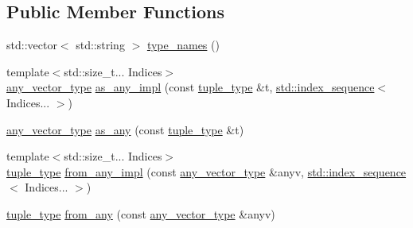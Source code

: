 \subsection*{Public Member Functions}
\begin{DoxyCompactItemize}
\item 
std\+::vector$<$ std\+::string $>$ \hyperlink{struct_wire_cell_1_1tuple__helper_3_01_t_3_01_types_8_8_8_01_4_01_4_a55bdb6587f4f043ac4bb8f661d6c18f7}{type\+\_\+names} ()
\item 
{\footnotesize template$<$std\+::size\+\_\+t... Indices$>$ }\\\hyperlink{struct_wire_cell_1_1tuple__helper_3_01_t_3_01_types_8_8_8_01_4_01_4_a09d92f40f36eccfe85165e6ab93a6217}{any\+\_\+vector\+\_\+type} \hyperlink{struct_wire_cell_1_1tuple__helper_3_01_t_3_01_types_8_8_8_01_4_01_4_a92048a9ccf4531bc1576e8684573e487}{as\+\_\+any\+\_\+impl} (const \hyperlink{struct_wire_cell_1_1tuple__helper_3_01_t_3_01_types_8_8_8_01_4_01_4_aef55cc988f5f41eff16f4a116bbd5fc5}{tuple\+\_\+type} \&t, \hyperlink{structstd_1_1index__sequence}{std\+::index\+\_\+sequence}$<$ Indices... $>$)
\item 
\hyperlink{struct_wire_cell_1_1tuple__helper_3_01_t_3_01_types_8_8_8_01_4_01_4_a09d92f40f36eccfe85165e6ab93a6217}{any\+\_\+vector\+\_\+type} \hyperlink{struct_wire_cell_1_1tuple__helper_3_01_t_3_01_types_8_8_8_01_4_01_4_a8f26063d1e734310dc6b733ace4a460f}{as\+\_\+any} (const \hyperlink{struct_wire_cell_1_1tuple__helper_3_01_t_3_01_types_8_8_8_01_4_01_4_aef55cc988f5f41eff16f4a116bbd5fc5}{tuple\+\_\+type} \&t)
\item 
{\footnotesize template$<$std\+::size\+\_\+t... Indices$>$ }\\\hyperlink{struct_wire_cell_1_1tuple__helper_3_01_t_3_01_types_8_8_8_01_4_01_4_aef55cc988f5f41eff16f4a116bbd5fc5}{tuple\+\_\+type} \hyperlink{struct_wire_cell_1_1tuple__helper_3_01_t_3_01_types_8_8_8_01_4_01_4_a4f9e5b34091dcc6c12f0440f00db33ed}{from\+\_\+any\+\_\+impl} (const \hyperlink{struct_wire_cell_1_1tuple__helper_3_01_t_3_01_types_8_8_8_01_4_01_4_a09d92f40f36eccfe85165e6ab93a6217}{any\+\_\+vector\+\_\+type} \&anyv, \hyperlink{structstd_1_1index__sequence}{std\+::index\+\_\+sequence}$<$ Indices... $>$)
\item 
\hyperlink{struct_wire_cell_1_1tuple__helper_3_01_t_3_01_types_8_8_8_01_4_01_4_aef55cc988f5f41eff16f4a116bbd5fc5}{tuple\+\_\+type} \hyperlink{struct_wire_cell_1_1tuple__helper_3_01_t_3_01_types_8_8_8_01_4_01_4_aac3be802651ad5c8f921c01857134f99}{from\+\_\+any} (const \hyperlink{struct_wire_cell_1_1tuple__helper_3_01_t_3_01_types_8_8_8_01_4_01_4_a09d92f40f36eccfe85165e6ab93a6217}{any\+\_\+vector\+\_\+type} \&anyv)
\end{DoxyCompactItemize}


